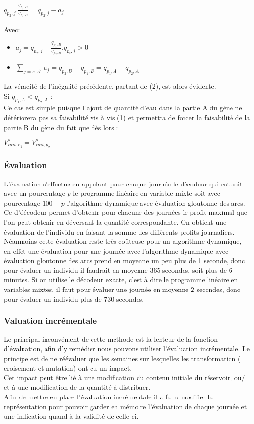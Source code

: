 \documentclass[a4paper]{report}
\begin{document}
 \begin{center}
 $q_{p_{2},j}.\frac{q_{p_{1},B}}{q_{p_{2},B}}= q_{p_{2},j}-a_{j}$
 \end{center}
 Avec:
 \begin{itemize}
 \item $a_{j}= q_{p_{2},j}- \frac{q_{p_{1},B}}{q_{p_{2},B}}. q_{p_{2},j}>0$
 \item$\sum_{j=s..51}a_{j}=q_{p_{2},B}-q_{p_{1},B}= q_{p_{1},A}-q_{p_{2},A}$
 \end{itemize}
 La véracité de l'inégalité précédente, partant de (2), est alors évidente.\\
  Si $q_{p_{1},A}<q_{p_{2},A}$ :\\
  Ce cas est simple puisque l'ajout de quantité d'eau dans la partie A du gène ne détériorera pas sa faisabilité vis à vis (1) et permettra de forcer la faisabilité de la partie  B du gène du fait que  dès lors :\\
  \begin{center}
  $V_{init,e_{1}}^{s}=V_{init,p_{2}}^{s}$
  \end{center}
\subsubsection{Évaluation}
L'évaluation s'effectue en appelant pour chaque journée le décodeur qui est soit avec un pourcentage $p$ le programme linéaire en variable mixte soit avec pourcentage $100-p$ l'algorithme dynamique avec évaluation gloutonne des arcs. Ce d'décodeur permet d'obtenir pour chacune des journées le profit maximal que l'on peut obtenir en déversant la quantité correspondante. On obtient une évaluation de l'individu en faisant la somme des différents profits journaliers.\\
Néanmoins cette évaluation reste très coûteuse pour un algorithme dynamique, en effet une évaluation pour une journée avec l'algorithme dynamique avec évaluation gloutonne des arcs prend en moyenne un peu plus de 1 seconde, donc pour évaluer un individu il faudrait en moyenne 365 secondes, soit plus de 6 minutes. Si on utilise le décodeur exacte, c'est à dire le programme linéaire en variables mixtes, il faut pour évaluer une journée en moyenne 2 secondes, donc pour évaluer un individu plus de 730 secondes.
\subsubsection{Valuation incrémentale}
Le principal inconvénient de cette méthode est la lenteur de la fonction d'évaluation, afin d'y remédier nous pouvons utiliser l'évaluation incrémentale.  Le principe est de ne réévaluer que les semaines sur lesquelles les transformation ( croisement et mutation) ont eu un impact. \\
Cet impact peut être lié à une modification du contenu initiale du réservoir, ou/ et à une modification de la quantité à distribuer.\\
Afin de mettre en place l'évaluation incrémentale il a fallu modifier la représentation pour pouvoir garder en mémoire l'évaluation de chaque journée et une indication quand à la validité de celle ci.
\end{document}
